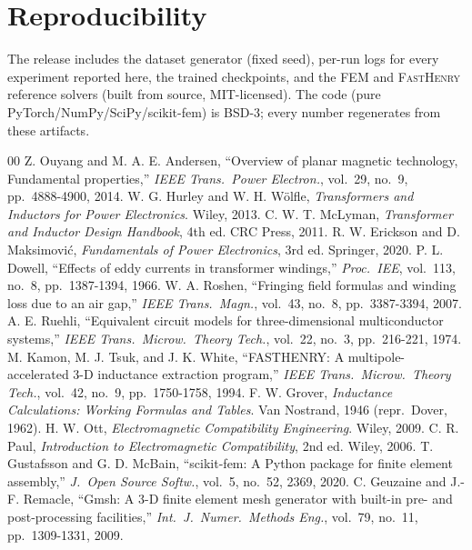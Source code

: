 \documentclass[letterpaper,twocolumn,9pt]{extarticle}
\begin{document}
\section*{Reproducibility}
The release includes the dataset generator (fixed seed), per-run logs for every
experiment reported here, the trained checkpoints, and the FEM and
\textsc{FastHenry} reference solvers (built from source, MIT-licensed). The code
(pure PyTorch/NumPy/SciPy/scikit-fem) is BSD-3; every number regenerates from
these artifacts.

{\scriptsize
\setlength{\itemsep}{-3pt}\setlength{\parskip}{-1pt}
\begin{thebibliography}{00}
 Z. Ouyang and M. A. E. Andersen, ``Overview of planar magnetic
technology, Fundamental properties,'' \emph{IEEE Trans.\ Power Electron.}, vol.\
29, no.\ 9, pp.\ 4888-4900, 2014.
 W. G. Hurley and W. H. W\"olfle, \emph{Transformers and Inductors
for Power Electronics}. Wiley, 2013.
 C. W. T. McLyman, \emph{Transformer and Inductor Design
Handbook}, 4th ed. CRC Press, 2011.
 R. W. Erickson and D. Maksimovi\'c, \emph{Fundamentals of Power
Electronics}, 3rd ed. Springer, 2020.
 P. L. Dowell, ``Effects of eddy currents in transformer
windings,'' \emph{Proc.\ IEE}, vol.\ 113, no.\ 8, pp.\ 1387-1394, 1966.
\bibitem{roshen} W. A. Roshen, ``Fringing field formulas and winding loss due to
an air gap,'' \emph{IEEE Trans.\ Magn.}, vol.\ 43, no.\ 8, pp.\ 3387-3394, 2007.
\bibitem{ruehli} A. E. Ruehli, ``Equivalent circuit models for three-dimensional
multiconductor systems,'' \emph{IEEE Trans.\ Microw.\ Theory Tech.}, vol.\ 22, no.\
3, pp.\ 216-221, 1974.
\bibitem{fasthenry} M. Kamon, M. J. Tsuk, and J. K. White, ``FASTHENRY: A
multipole-accelerated 3-D inductance extraction program,'' \emph{IEEE Trans.\
Microw.\ Theory Tech.}, vol.\ 42, no.\ 9, pp.\ 1750-1758, 1994.
\bibitem{grover} F. W. Grover, \emph{Inductance Calculations: Working Formulas and Tables}. Van Nostrand, 1946 (repr.\ Dover, 1962).
\bibitem{ott} H. W. Ott, \emph{Electromagnetic Compatibility Engineering}. Wiley,
2009.
\bibitem{paul} C. R. Paul, \emph{Introduction to Electromagnetic Compatibility},
2nd ed. Wiley, 2006.
 T. Gustafsson and G. D. McBain, ``scikit-fem: A Python package for
finite element assembly,'' \emph{J.\ Open Source Softw.}, vol.\ 5, no.\ 52, 2369,
2020.
\bibitem{gmsh} C. Geuzaine and J.-F. Remacle, ``Gmsh: A 3-D finite element mesh
generator with built-in pre- and post-processing facilities,'' \emph{Int.\ J.\
Numer.\ Methods Eng.}, vol.\ 79, no.\ 11, pp.\ 1309-1331, 2009.

\end{thebibliography}}
\end{document}
